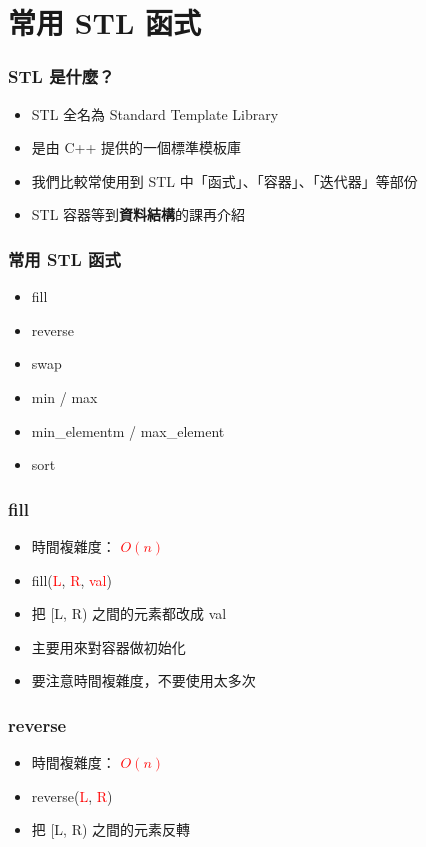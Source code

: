 \documentclass[mathserif]{beamer}
\begin{document}
\section{常用 STL 函式}

\begin{frame}
    \frametitle{STL 是什麼？}
    \begin{itemize}
        \item STL 全名為 Standard Template Library
        \item 是由 C++ 提供的一個標準模板庫
        \item 我們比較常使用到 STL 中「函式」、「容器」、「迭代器」等部份
        \vspace{0.5cm}
        \item STL 容器等到\textbf{資料結構}的課再介紹
    \end{itemize}
\end{frame}

\begin{frame}
    \frametitle{常用 STL 函式}
    \begin{itemize}
        \item fill
        \item reverse
        \item swap
        \item min / max
        \item min\_elementm / max\_element
        \item sort
    \end{itemize}
\end{frame}

\begin{frame}
    \frametitle{fill}
    \begin{itemize}
        \item 時間複雜度： \textcolor{red}{\textbf{$O(n)$}}
        \item fill(\textcolor{red}{L}, \textcolor{red}{R}, \textcolor{red}{val})
        \item 把 [L, R) 之間的元素都改成 val
        \vspace{0.5cm}
        \item 主要用來對容器做初始化
        \item 要注意時間複雜度，不要使用太多次
    \end{itemize}
\end{frame}

\begin{frame}
    \frametitle{reverse}
    \begin{itemize}
        \item 時間複雜度： \textcolor{red}{\textbf{$O(n)$}}
        \item reverse(\textcolor{red}{L}, \textcolor{red}{R})
        \item 把 [L, R) 之間的元素反轉
    \end{itemize}
\end{frame}
\end{document}
